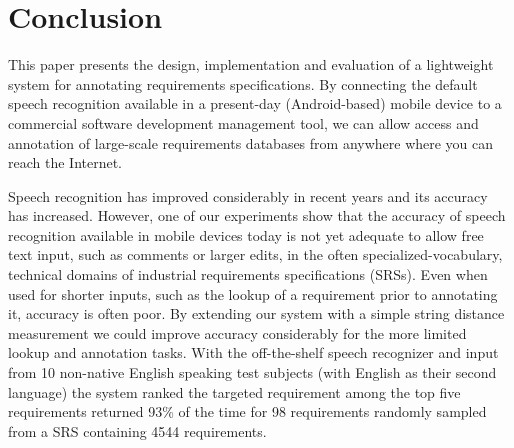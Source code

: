 \documentclass[conference]{IEEEtran}
\begin{document}
%





\section{Conclusion}
\label{sec:concl}
This paper presents the design, implementation and evaluation of a lightweight system for annotating requirements specifications. 
By connecting the default speech recognition available in a present-day (Android-based) mobile device to a commercial software development management tool, we can allow access and annotation of large-scale requirements databases from anywhere where you can reach the Internet. 

Speech recognition has improved considerably in recent years and its accuracy has increased. 
However, one of our experiments show that the accuracy of speech recognition available in mobile devices today is not yet adequate to allow free text input, such as comments or larger edits, in the often specialized-vocabulary, technical domains of industrial requirements specifications (SRSs). 
Even when used for shorter inputs, such as the lookup of a requirement prior to annotating it, accuracy is often poor. 
By extending our system with a simple string distance measurement we could improve accuracy considerably for the more limited lookup and annotation tasks.
With the off-the-shelf speech recognizer and input from 10 non-native English speaking test subjects (with English as their second language) the system ranked the targeted requirement among the top five requirements returned 93\% of the time for 98 requirements randomly sampled from a SRS containing 4544 requirements.
\end{document}
